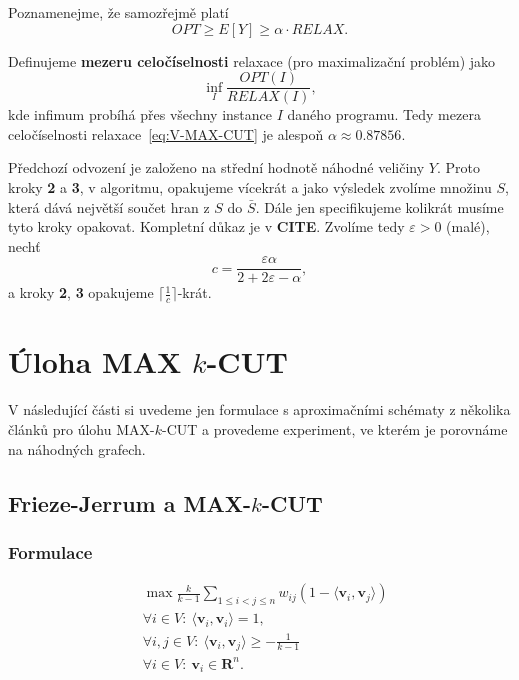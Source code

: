 Poznamenejme, že samozřejmě platí
$$
    OPT \geq E\left[ Y \right] \geq \alpha \cdot RELAX.
$$

Definujeme \textbf{mezeru celočíselnosti} relaxace (pro maximalizační problém) jako
$$
    \inf_{I} \frac{OPT(I)}{RELAX(I)},
$$
kde infimum probíhá přes všechny instance $I$ daného programu. Tedy mezera celočíselnosti relaxace~\ref{eq:V-MAX-CUT} je alespoň $\alpha \approx 0.87856$.

Předchozí odvození je založeno na střední hodnotě náhodné veličiny $Y$. Proto kroky \textbf{2} a \textbf{3}, v algoritmu, opakujeme vícekrát a jako výsledek zvolíme množinu $S$, která dává největší součet hran z $S$ do $\bar{S}$. Dále jen specifikujeme kolikrát musíme tyto kroky opakovat. Kompletní důkaz je v \textbf{CITE}. Zvolíme tedy $\varepsilon > 0$ (malé), nechť
$$
    c = \frac{\varepsilon \alpha}{2 + 2\varepsilon - \alpha},
$$
a kroky \textbf{2}, \textbf{3} opakujeme $\lceil \frac{1}{c} \rceil$-krát.


\section{Úloha MAX $k$-CUT}

V následující části si uvedeme jen formulace s aproximačními schématy z několika článků pro úlohu MAX-$k$-CUT a provedeme experiment, ve kterém je porovnáme na náhodných grafech.

\subsection{Frieze-Jerrum a MAX-$k$-CUT}

\subsubsection*{Formulace}

\begin{equation}\tag{FJ-MAX-$k$-CUT}
    \begin{split}
        &\max \frac{k}{k-1} \sum_{1 \leq i < j \leq n} w_{ij} (1 - \langle \mathbf{v}_i, \mathbf{v}_j \rangle) \\
        &\forall i \in V:\ \langle \mathbf{v}_i, \mathbf{v}_i \rangle = 1, \\
        &\forall i,j \in V:\ \langle \mathbf{v}_i, \mathbf{v}_j \rangle \geq -\frac{1}{k-1} \\
        &\forall i \in V:\ \mathbf{v}_i \in \mathbf{R}^n.
    \end{split}
    \label{eq:FJ-MAX-k-CUT}
\end{equation}

